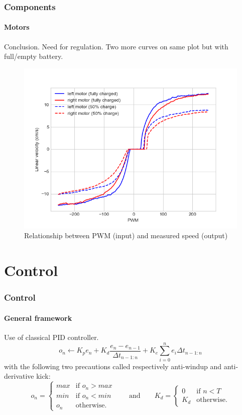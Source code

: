 \documentclass{beamer}
\begin{document}
\begin{frame}
\frametitle{Components}
\framesubtitle{Motors}
Conclusion. Need for regulation. Two more curves on same plot but with full/empty battery.
\begin{figure}[hbtp]
\centering
\includegraphics[scale=0.4]{figures/motors_merged.png}
\caption{Relationship between PWM (input) and measured speed (output)}
\end{figure}

\end{frame}


\section{Control} 

\begin{frame}
\frametitle{Control}
\framesubtitle{General framework}
Use of classical PID controller.
$$ 
o_n \leftarrow K_p e_n + K_d\frac{e_n - e_{n-1}}{\Delta t_{n-1:n}} + K_e\sum_{i=0}^{n}{e_i \Delta t_{n-1:n}}
$$
with the following two precautions called respectively anti-windup and anti-derivative kick:
$$
o_n = \left\{
    \begin{array}{ll}
        max & \mbox{if } o_n > max \\
        min & \mbox{if } o_n < min \\
        o_n & \mbox{otherwise.}
    \end{array}
\right.
\qquad\text{and}\qquad	
K_d = \left\{
    \begin{array}{ll}
        0 & \mbox{if } n < T \\
       K_d & \mbox{otherwise.}
    \end{array}
\right.
$$
\end{frame}
\end{document}

